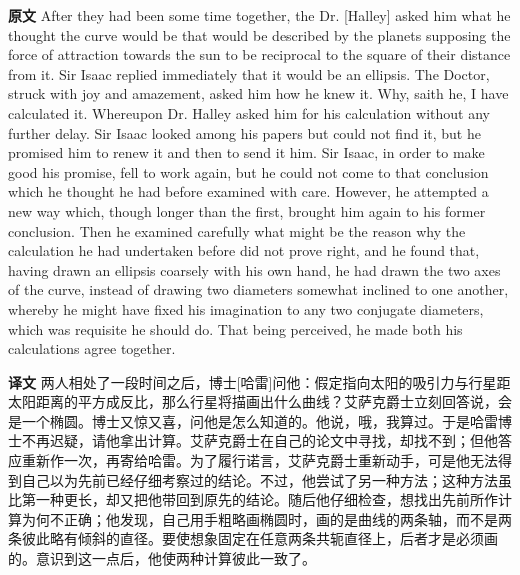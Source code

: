 \documentclass[UTF8,zihao=-4]{ctexart}
\newcommand{\BodyFont}{\fontsize{10.5pt}{15.5pt}\selectfont}
\renewenvironment{quote}{\par\noindent\begingroup\BodyFont}{\par\endgroup}
\begin{document}
\begin{quote}
\noindent\textbf{原文} After they had been some time together, the Dr. [Halley] asked him what he thought the curve would be that would be described by the planets supposing the force of attraction towards the sun to be reciprocal to the square of their distance from it. Sir Isaac replied immediately that it would be an ellipsis. The Doctor, struck with joy and amazement, asked him how he knew it. Why, saith he, I have calculated it. Whereupon Dr. Halley asked him for his calculation without any further delay. Sir Isaac looked among his papers but could not find it, but he promised him to renew it and then to send it him. Sir Isaac, in order to make good his promise, fell to work again, but he could not come to that conclusion which he thought he had before examined with care. However, he attempted a new way which, though longer than the first, brought him again to his former conclusion. Then he examined carefully what might be the reason why the calculation he had undertaken before did not prove right, and he found that, having drawn an ellipsis coarsely with his own hand, he had drawn the two axes of the curve, instead of drawing two diameters somewhat inclined to one another, whereby he might have fixed his imagination to any two conjugate diameters, which was requisite he should do. That being perceived, he made both his calculations agree together.
\par\noindent\textbf{译文} 两人相处了一段时间之后，博士[哈雷]问他：假定指向太阳的吸引力与行星距太阳距离的平方成反比，那么行星将描画出什么曲线？艾萨克爵士立刻回答说，会是一个椭圆。博士又惊又喜，问他是怎么知道的。他说，哦，我算过。于是哈雷博士不再迟疑，请他拿出计算。艾萨克爵士在自己的论文中寻找，却找不到；但他答应重新作一次，再寄给哈雷。为了履行诺言，艾萨克爵士重新动手，可是他无法得到自己以为先前已经仔细考察过的结论。不过，他尝试了另一种方法；这种方法虽比第一种更长，却又把他带回到原先的结论。随后他仔细检查，想找出先前所作计算为何不正确；他发现，自己用手粗略画椭圆时，画的是曲线的两条轴，而不是两条彼此略有倾斜的直径。要使想象固定在任意两条共轭直径上，后者才是必须画的。意识到这一点后，他使两种计算彼此一致了。
\end{quote}
\end{document}

